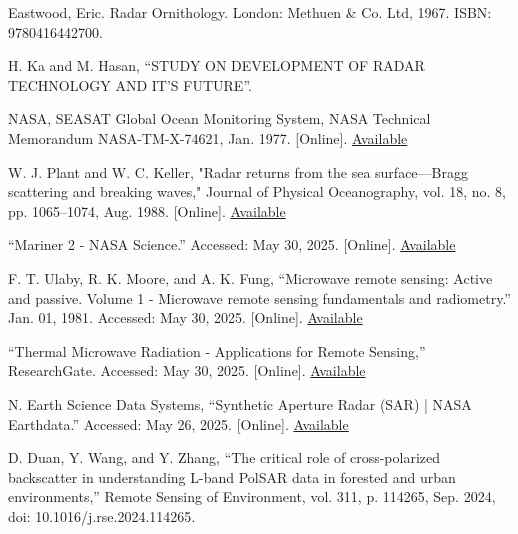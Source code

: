 \documentclass{article}
\begin{document}
{\begin{enumerate}
{    %
    \item{Eastwood, Eric. Radar Ornithology. London: Methuen & Co. Ltd, 1967. ISBN: 9780416442700.}

    \item{H. Ka and M. Hasan, “STUDY ON DEVELOPMENT OF RADAR TECHNOLOGY AND IT’S FUTURE”.}

    \item{NASA, SEASAT Global Ocean Monitoring System, NASA Technical Memorandum NASA-TM-X-74621, Jan. 1977. [Online]. \href{https://ntrs.nasa.gov/citations/19770017623}{Available}}

    \item{W. J. Plant and W. C. Keller, "Radar returns from the sea surface—Bragg scattering and breaking waves," Journal of Physical Oceanography, vol. 18, no. 8, pp. 1065–1074, Aug. 1988. [Online]. \href{https://journals.ametsoc.org/view/journals/phoc/18/8/1520-0485_1988_018_1065_rrftss_2_0_co_2.pdf}{Available}}

    \item{“Mariner 2 - NASA Science.” Accessed: May 30, 2025. [Online]. \href{https://science.nasa.gov/mission/mariner-2/}{Available}}

    \item{F. T. Ulaby, R. K. Moore, and A. K. Fung, “Microwave remote sensing: Active and passive. Volume 1 - Microwave remote sensing fundamentals and radiometry.” Jan. 01, 1981. Accessed: May 30, 2025. [Online]. \href{https://ntrs.nasa.gov/citations/19820039342}{Available}}

    \item{“Thermal Microwave Radiation - Applications for Remote Sensing,” ResearchGate. Accessed: May 30, 2025. [Online]. \href{https://www.researchgate.net/publication/234004285_Thermal_Microwave_Radiation_-_Applications_for_Remote_Sensing}{Available}}

    \item{N. Earth Science Data Systems, “Synthetic Aperture Radar (SAR) | NASA Earthdata.” Accessed: May 26, 2025. [Online]. \href{https://www.earthdata.nasa.gov/learn/earth-observation-data-basics/sar}{Available}}

    \item{D. Duan, Y. Wang, and Y. Zhang, “The critical role of cross-polarized backscatter in understanding L-band PolSAR data in forested and urban environments,” Remote Sensing of Environment, vol. 311, p. 114265, Sep. 2024, doi: 10.1016/j.rse.2024.114265.}

}
\end{enumerate}}
\end{document}
